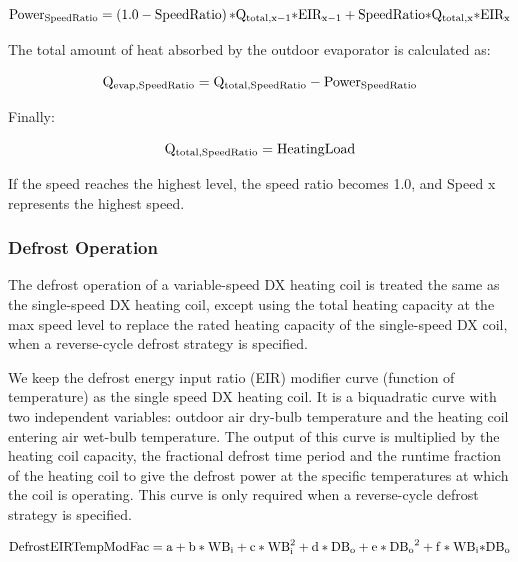 \begin{equation}
{\rm{Powe}}{{\rm{r}}_{{\rm{SpeedRatio}}}} = \left( {1.0 - {\rm{SpeedRatio}}} \right){\rm{*}}{{\rm{Q}}_{{\rm{total}},{\rm{x}} - 1}}{\rm{*EI}}{{\rm{R}}_{{\rm{x}} - 1}} + {\rm{SpeedRatio*}}{{\rm{Q}}_{{\rm{total}},{\rm{x}}}}{\rm{*EI}}{{\rm{R}}_{\rm{x}}}
\end{equation}

The total amount of heat absorbed by the outdoor evaporator is calculated as:

\begin{equation}
{{\rm{Q}}_{{\rm{evap}},{\rm{SpeedRatio}}}} = {{\rm{Q}}_{{\rm{total}},{\rm{SpeedRatio}}}} - {\rm{Powe}}{{\rm{r}}_{{\rm{SpeedRatio}}}}
\end{equation}

Finally:

\begin{equation}
{{\rm{Q}}_{{\rm{total}},{\rm{SpeedRatio}}}} = {\rm{HeatingLoad}}
\end{equation}

If the speed reaches the highest level, the speed ratio becomes 1.0, and Speed x represents the highest speed.

\subsubsection{Defrost Operation}\label{defrost-operation-1}

The defrost operation of a variable-speed DX heating coil is treated the same as the single-speed DX heating coil, except using the total heating capacity at the max speed level to replace the rated heating capacity of the single-speed DX coil, when a reverse-cycle defrost strategy is specified.

We keep the defrost energy input ratio (EIR) modifier curve (function of temperature) as the single speed DX heating coil. It is a biquadratic curve with two independent variables: outdoor air dry-bulb temperature and the heating coil entering air wet-bulb temperature. The output of this curve is multiplied by the heating coil capacity, the fractional defrost time period and the runtime fraction of the heating coil to give the defrost power at the specific temperatures at which the coil is operating. This curve is only required when a reverse-cycle defrost strategy is specified.

\begin{equation}
{\rm{DefrostEIRTempModFac}} = {\rm{a}} + {\rm{b*W}}{{\rm{B}}_{\rm{i}}} + {\rm{c*WB}}_{\rm{i}}^2 + {\rm{d*D}}{{\rm{B}}_{\rm{o}}} + {\rm{e*D}}{{\rm{B}}_{\rm{o}}}^2 + {\rm{f*W}}{{\rm{B}}_{\rm{i}}}{\rm{*D}}{{\rm{B}}_{\rm{o}}}
\end{equation}

